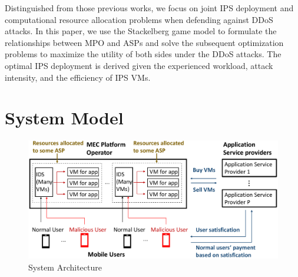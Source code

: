 \documentclass[10pt,journal, compsoc]{IEEEtran}
\begin{document}
Distinguished from those previous works, we focus on joint IPS deployment and computational resource allocation problems when defending against DDoS attacks. In this paper, we use the Stackelberg game model to formulate the relationships between MPO and ASPs and solve the subsequent optimization problems to maximize the utility of both sides under the DDoS attacks. The optimal IPS deployment is derived given the experienced workload, attack intensity, and the efficiency of IPS VMs.
\section{System Model}\label{sec:system_model}
\begin{figure}
\centering
\includegraphics[width= 0.7\columnwidth]{5GDDoS_Game_system_architecture.pdf}
\caption{System Architecture}
\label{fig:system}
\end{figure}
\end{document}
